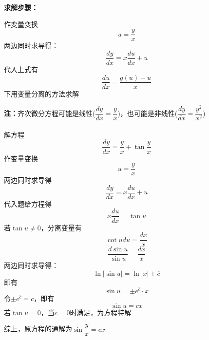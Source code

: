 \documentclass[oneside]{book} %
\begin{document}
\noindent \textbf{求解步骤：}

作变量变换
$$u = \frac{y}{x}$$
\indent 两边同时求导得：
$$\frac{dy}{dx} = x \frac{du}{dx} + u$$
\indent 代入上式有
$$\frac{du}{dx} = \frac{g(u) - u}{x}$$
\indent 下用变量分离的方法求解

\textbf{注：}齐次微分方程可能是线性($\dfrac{dy}{dx} = \dfrac{y}{x}$)，也可能是非线性($\dfrac{dy}{dx} = \dfrac{y^{2}}{x^{2}}$)
\\ \hspace*{\fill} \\
解方程
$$\frac{dy}{dx} = \frac{y}{x} + \tan \dfrac{y}{x}$$
作变量变换
$$u = \frac{y}{x}$$
\indent 两边同时求导得
$$\frac{dy}{dx} = x \frac{du}{dx} + u$$
\indent 代入题给方程得
$$x \frac{du}{dx} = \tan u$$
\indent 若$\tan u \neq 0$，分离变量有
$$\cot u du = \frac{dx}{x}$$
$$\frac{d \sin u}{\sin u} = \frac{dx}{x}$$
\indent 两边同时求导得：
$$\ln \left\lvert \sin u\right\rvert = \ln \left\lvert x\right\rvert + \overline{c} $$
\indent 即有
$$\sin u = \pm e^{\overline{c}} \cdot x$$
\indent 令$\pm e^{\overline{c}} = c$，即有
$$\sin u = cx$$
\indent 若$\tan u = 0$，当$c = 0$时满足，为方程特解

综上，原方程的通解为$\sin \dfrac{y}{x} = cx$
\end{document}

